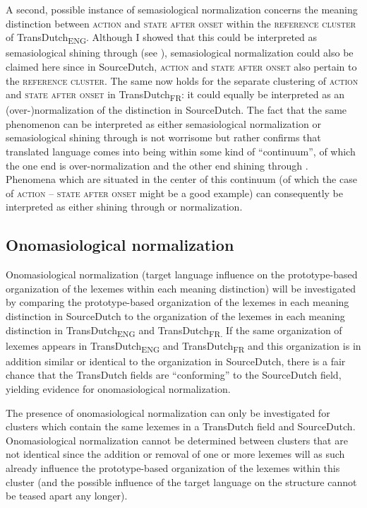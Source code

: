 A second, possible instance of semasiological normalization concerns the meaning distinction between \textsc{action} and \textsc{state after onset} within the \textsc{reference cluster} of TransDutch\textsubscript{ENG}. Although I showed that this could be interpreted as semasiological shining through (see ), semasiological normalization could also be claimed here since in SourceDutch, \textsc{action} and \textsc{state after onset} also pertain to the \textsc{reference cluster}. The same now holds for the separate clustering of \textsc{action} and \textsc{state after onset} in TransDutch\textsubscript{FR}: it could equally be interpreted as an (over-)normalization of the distinction in SourceDutch. The fact that the same phenomenon can be interpreted as either semasiological normalization or semasiological shining through is not worrisome but rather confirms that translated language comes into being within some kind of ``continuum'', of which the one end is over-normalization and the other end shining through \citep[272]{hansen-schirra_towards_2012}. Phenomena which are situated in the center of this continuum (of which the case of \textsc{action} – \textsc{state after onset} might be a good example) can consequently be interpreted as either shining through or normalization.

\subsection{Onomasiological normalization}
\label{sec:4.7.2}  
Onomasiological normalization (target language influence on the prototype-based organization of the lexemes within each meaning distinction) will be investigated by comparing the prototype-based organization of the lexemes in each meaning distinction in SourceDutch to the organization of the lexemes in each meaning distinction in TransDutch\textsubscript{ENG} and TransDutch\textsubscript{FR.} If the same organization of lexemes appears in TransDutch\textsubscript{ENG} and TransDutch\textsubscript{FR} and this organization is in addition similar or identical to the organization in SourceDutch, there is a fair chance that the TransDutch fields are ``conforming'' to the SourceDutch field, yielding evidence for onomasiological normalization.

The presence of onomasiological normalization can only be investigated for clusters which contain the same lexemes in a TransDutch field and SourceDutch. Onomasiological normalization cannot be determined between clusters that are not identical since the addition or removal of one or more lexemes will as such already influence the prototype-based organization of the lexemes within this cluster (and the possible influence of the target language on the structure cannot be teased apart any longer).


